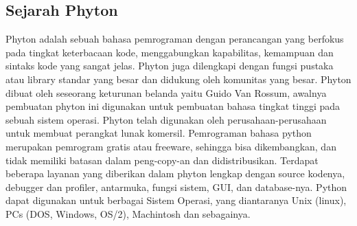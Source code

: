 \subsection{Sejarah Phyton}
Phyton adalah sebuah bahasa pemrograman dengan perancangan yang berfokus pada tingkat keterbacaan kode, menggabungkan kapabilitas, kemampuan dan sintaks kode yang sangat jelas. Phyton juga dilengkapi dengan fungsi pustaka atau library standar yang besar dan didukung oleh komunitas yang besar. Phyton dibuat oleh seseorang keturunan belanda yaitu Guido Van Rossum, awalnya pembuatan phyton ini digunakan untuk pembuatan bahasa tingkat tinggi pada sebuah sistem operasi. Phyton telah digunakan oleh perusahaan-perusahaan untuk membuat perangkat lunak komersil. Pemrograman bahasa python merupakan pemrogram gratis atau freeware, sehingga bisa dikembangkan, dan tidak memiliki batasan dalam peng-copy-an dan didistribusikan. Terdapat beberapa layanan yang diberikan dalam phyton lengkap dengan source kodenya, debugger dan profiler, antarmuka, fungsi sistem, GUI, dan database-nya. Python dapat digunakan untuk berbagai Sistem Operasi, yang diantaranya Unix (linux), PCs (DOS, Windows, OS/2), Machintosh dan sebagainya.


